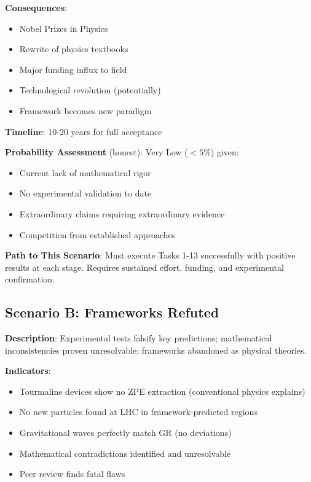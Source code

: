 \textbf{Consequences}:
\begin{itemize}
    \item Nobel Prizes in Physics
    \item Rewrite of physics textbooks
    \item Major funding influx to field
    \item Technological revolution (potentially)
    \item Framework becomes new paradigm
\end{itemize}

\textbf{Timeline}: 10-20 years for full acceptance

\textbf{Probability Assessment} (honest): Very Low ($< 5\%$) given:
\begin{itemize}
    \item Current lack of mathematical rigor
    \item No experimental validation to date
    \item Extraordinary claims requiring extraordinary evidence
    \item Competition from established approaches
\end{itemize}

\textbf{Path to This Scenario}:
Must execute Tasks 1-13 successfully with positive results at each stage. Requires sustained effort, funding, and experimental confirmation.

\subsection{Scenario B: Frameworks Refuted}

\textbf{Description}: Experimental tests falsify key predictions; mathematical inconsistencies proven unresolvable; frameworks abandoned as physical theories.

\textbf{Indicators}:
\begin{itemize}
    \item Tourmaline devices show no ZPE extraction (conventional physics explains)
    \item No new particles found at LHC in framework-predicted regions
    \item Gravitational waves perfectly match GR (no deviations)
    \item Mathematical contradictions identified and unresolvable
    \item Peer review finds fatal flaws
\end{itemize}

